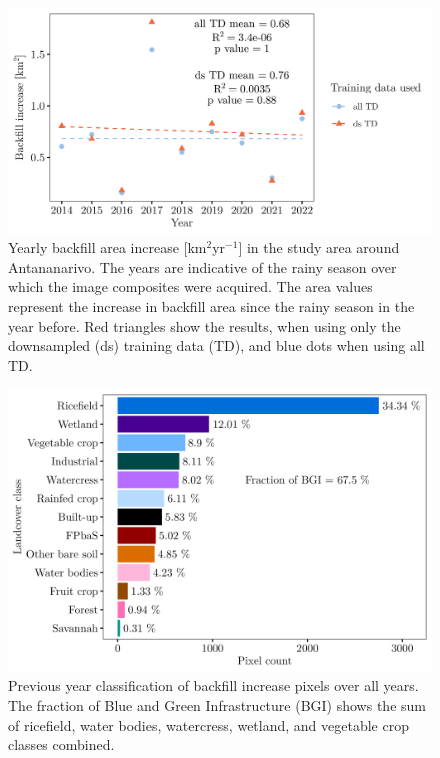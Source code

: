 \documentclass[11pt, A4, oneside]{report}
\begin{document}
\newpage
\begin{figure}[H]
\includegraphics[width = 15cm]{figures/3_results/Backfill area increase km 2.png}
\caption{Yearly backfill area increase [km$^2$yr$^{-1}$] in the study area around Antananarivo. The years are indicative of the rainy season over which the image composites were acquired. The area values represent the increase in backfill area since the rainy season in the year before. Red triangles show the results, when using only the downsampled (ds) training data (TD), and blue dots when using all TD.}
\label{fig:areakm2}
\end{figure}

\begin{figure}[H]
\includegraphics[width = 15cm]{figures/3_results/what was backfilled.png}
\caption{Previous year classification of backfill increase pixels over all years. The fraction of Blue and Green Infrastructure (BGI) shows the sum of ricefield, water bodies, watercress, wetland, and vegetable crop classes combined.}
\label{fig:conversionRate}
\end{figure}
\end{document}
